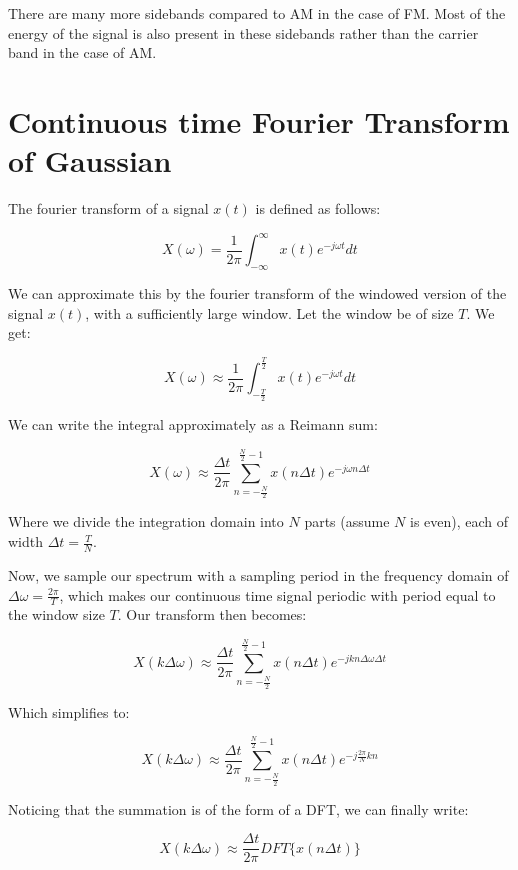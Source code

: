 \documentclass[11pt]{article}
\begin{document}
	
		
    There are many more sidebands compared to AM in the case of FM. Most of
the energy of the signal is also present in these sidebands rather than
the carrier band in the case of AM.

	

	
		
    \section{Continuous time Fourier Transform of
Gaussian}\label{continuous-time-fourier-transform-of-gaussian}

	

	
		
    The fourier transform of a signal \(x(t)\) is defined as follows:

\[X(\omega) = \frac{1}{2 \pi} \int_{- \infty}^{\infty} x(t) e^{-j \omega t} dt\]

We can approximate this by the fourier transform of the windowed version
of the signal \(x(t)\), with a sufficiently large window. Let the window
be of size \(T\). We get:

\[X(\omega) \approx \frac{1}{2 \pi} \int_{- \frac{T}{2}}^{\frac{T}{2}} x(t) e^{-j \omega t} dt\]

We can write the integral approximately as a Reimann sum:

\[X(\omega) \approx \frac{\Delta t}{2 \pi} \sum_{n = -\frac{N}{2}}^{\frac{N}{2}-1} x(n \Delta t) e^{-j \omega n \Delta t}\]

Where we divide the integration domain into \(N\) parts (assume \(N\) is
even), each of width \(\Delta t = \frac{T}{N}\).

Now, we sample our spectrum with a sampling period in the frequency
domain of \(\Delta \omega = \frac{2 \pi}{T}\), which makes our
continuous time signal periodic with period equal to the window size
\(T\). Our transform then becomes:

\[X(k \Delta \omega) \approx \frac{\Delta t}{2 \pi} \sum_{n = -\frac{N}{2}}^{\frac{N}{2}-1} x(n \Delta t) e^{-j k n \Delta \omega \Delta t}\]

Which simplifies to:

\[X(k \Delta \omega) \approx \frac{\Delta t}{2 \pi} \sum_{n = -\frac{N}{2}}^{\frac{N}{2}-1} 
x(n \Delta t) e^{-j \frac{2 \pi}{N} k n}\]

Noticing that the summation is of the form of a DFT, we can finally
write:

\[X(k \Delta \omega) \approx \frac{\Delta t}{2 \pi} DFT \{x(n \Delta t)\}\]
\end{document}
